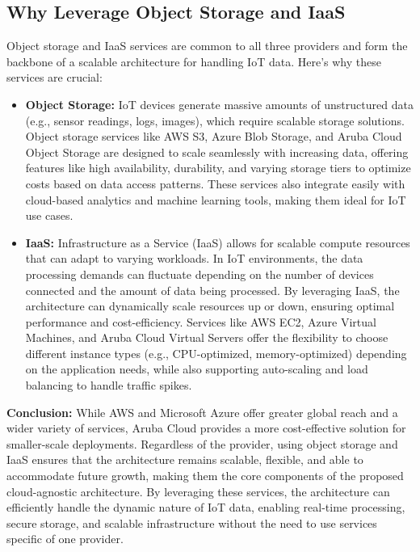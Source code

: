 \subsection*{Why Leverage Object Storage and IaaS}
Object storage and IaaS services are common to all three providers and form the backbone of a scalable architecture for handling IoT data. Here’s why these services are crucial:

\begin{itemize}
    \item \textbf{Object Storage:} IoT devices generate massive amounts of unstructured data (e.g., sensor readings, logs, images), which require scalable storage solutions. Object storage services like AWS S3, Azure Blob Storage, and Aruba Cloud Object Storage are designed to scale seamlessly with increasing data, offering features like high availability, durability, and varying storage tiers to optimize costs based on data access patterns. These services also integrate easily with cloud-based analytics and machine learning tools, making them ideal for IoT use cases.
    
    \item \textbf{IaaS:} Infrastructure as a Service (IaaS) allows for scalable compute resources that can adapt to varying workloads. In IoT environments, the data processing demands can fluctuate depending on the number of devices connected and the amount of data being processed. By leveraging IaaS, the architecture can dynamically scale resources up or down, ensuring optimal performance and cost-efficiency. Services like AWS EC2, Azure Virtual Machines, and Aruba Cloud Virtual Servers offer the flexibility to choose different instance types (e.g., CPU-optimized, memory-optimized) depending on the application needs, while also supporting auto-scaling and load balancing to handle traffic spikes.
\end{itemize}

\textbf{Conclusion:} While AWS and Microsoft Azure offer greater global reach and a wider variety of services, Aruba Cloud provides a more cost-effective solution for smaller-scale deployments. Regardless of the provider, using object storage and IaaS ensures that the architecture remains scalable, flexible, and able to accommodate future growth, making them the core components of the proposed cloud-agnostic architecture. By leveraging these services, the architecture can efficiently handle the dynamic nature of IoT data, enabling real-time processing, secure storage, and scalable infrastructure without the need to use services specific of one provider.

